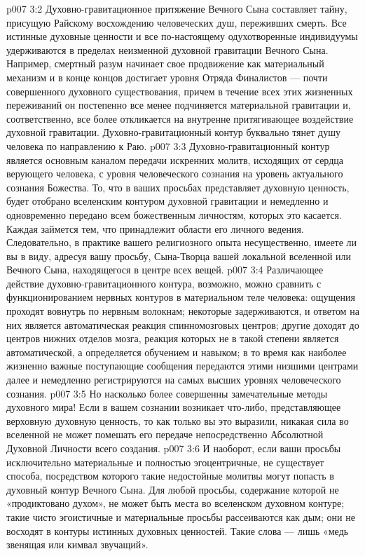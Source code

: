 \vs p007 3:2 Духовно\hyp{}гравитационное притяжение Вечного Сына составляет тайну, присущую Райскому восхождению человеческих душ, переживших смерть. Все истинные духовные ценности и все по\hyp{}настоящему одухотворенные индивидуумы удерживаются в пределах неизменной духовной гравитации Вечного Сына. Например, смертный разум начинает свое продвижение как материальный механизм и в конце концов достигает уровня Отряда Финалистов --- почти совершенного духовного существования, причем в течение всех этих жизненных переживаний он постепенно все менее подчиняется материальной гравитации и, соответственно, все более откликается на внутренне притягивающее воздействие духовной гравитации. Духовно\hyp{}гравитационный контур буквально тянет душу человека по направлению к Раю.
\vs p007 3:3 \pc Духовно\hyp{}гравитационный контур является основным каналом передачи искренних молитв, исходящих от сердца верующего человека, с уровня человеческого сознания на уровень актуального сознания Божества. То, что в ваших просьбах представляет духовную ценность, будет отобрано вселенским контуром духовной гравитации и немедленно и одновременно передано всем божественным личностям, которых это касается. Каждая займется тем, что принадлежит области его личного ведения. Следовательно, в практике вашего религиозного опыта несущественно, имеете ли вы в виду, адресуя вашу просьбу, Сына\hyp{}Творца вашей локальной вселенной или Вечного Сына, находящегося в центре всех вещей.
\vs p007 3:4 \pc Различающее действие духовно\hyp{}гравитационного контура, возможно, можно сравнить с функционированием нервных контуров в материальном теле человека: ощущения проходят вовнутрь по нервным волокнам; некоторые задерживаются, и ответом на них является автоматическая реакция спинномозговых центров; другие доходят до центров нижних отделов мозга, реакция которых не в такой степени является автоматической, а определяется обучением и навыком; в то время как наиболее жизненно важные поступающие сообщения передаются этими низшими центрами далее и немедленно регистрируются на самых высших уровнях человеческого сознания.
\vs p007 3:5 Но насколько более совершенны замечательные методы духовного мира! Если в вашем сознании возникает что\hyp{}либо, представляющее верховную духовную ценность, то как только вы это выразили, никакая сила во вселенной не может помешать его передаче непосредственно Абсолютной Духовной Личности всего создания.
\vs p007 3:6 И наоборот, если ваши просьбы исключительно материальные и полностью эгоцентричные, не существует способа, посредством которого такие недостойные молитвы могут попасть в духовный контур Вечного Сына. Для любой просьбы, содержание которой не «продиктовано духом», не может быть места во вселенском духовном контуре; такие чисто эгоистичные и материальные просьбы рассеиваются как дым; они не восходят в контуры истинных духовных ценностей. Такие слова --- лишь «медь звенящая или кимвал звучащий».
